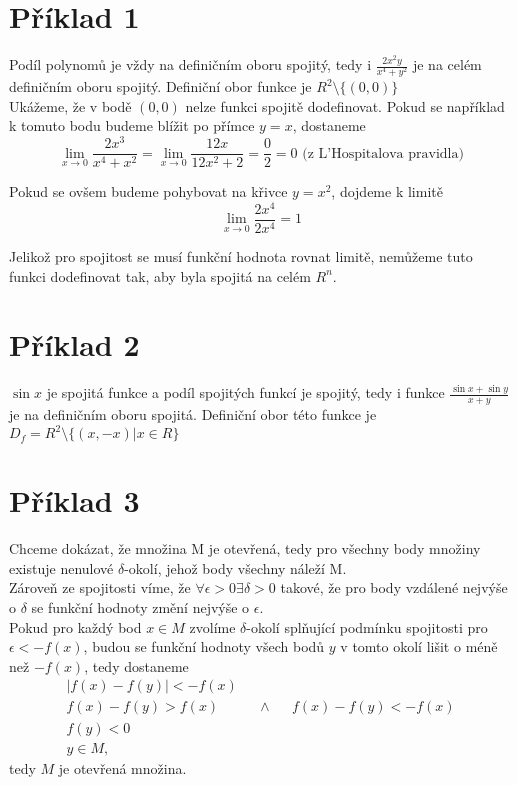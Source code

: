 \documentclass[11pt,a4paper]{article}
\begin{document}
\section*{Příklad 1}
Podíl polynomů je vždy na definičním oboru spojitý, tedy i $\frac{2x^2y}{x^4+y^2}$ je na celém definičním oboru spojitý. Definiční obor funkce je $R^2 \setminus \{(0,0)\}$\\

Ukážeme, že v bodě $(0,0)$ nelze funkci spojitě dodefinovat. Pokud se například k tomuto bodu budeme blížit po přímce $y = x$, dostaneme
\begin{equation*}
\lim_{x \to 0} \frac{2x^3}{x^4+x^2} = \lim_{x \to 0} \frac{12x}{12x^2+2} =
\frac{0}{2} = 0 \text{ (z L'Hospitalova pravidla)}
\end{equation*}

Pokud se ovšem budeme pohybovat na křivce $y = x^2$, dojdeme k limitě
\begin{equation*}
\lim_{x \to 0} \frac{2x^4}{2x^4} = 1
\end{equation*}

Jelikož pro spojitost se musí funkční hodnota rovnat limitě, nemůžeme tuto funkci dodefinovat tak, aby byla spojitá na celém $R^n$.

\section*{Příklad 2}
$\sin x$ je spojitá funkce a podíl spojitých funkcí je spojitý, tedy i funkce 
$\frac{\sin x + \sin y}{x+y}$ je na definičním oboru spojitá. Definiční obor této funkce je $D_f = R^2 \setminus \{(x, -x) \vert x \in R\}$

\section*{Příklad 3}
Chceme dokázat, že množina M je otevřená, tedy pro všechny body množiny existuje nenulové $\delta$-okolí, jehož body všechny náleží M.\\
Zároveň ze spojitosti víme, že $\forall \epsilon > 0 \exists \delta > 0$ takové, že pro body vzdálené nejvýše o $\delta$ se funkční hodnoty změní nejvýše o $\epsilon$.\\

Pokud pro každý bod $x \in M$ zvolíme $\delta$-okolí splňující podmínku spojitosti pro $\epsilon < -f(x)$, budou se funkční hodnoty všech bodů $y$ v tomto okolí lišit o méně než $-f(x)$, tedy dostaneme 
\begin{align*}
\vert f(x) - f(y) \vert < -f(x) \\
f(x) - f(y) > f(x)  && \wedge && f(x) - f(y) < -f(x)\\
f(y) < 0 \\
y \in M,
\end{align*}
tedy $M$ je otevřená množina. 
\end{document}
